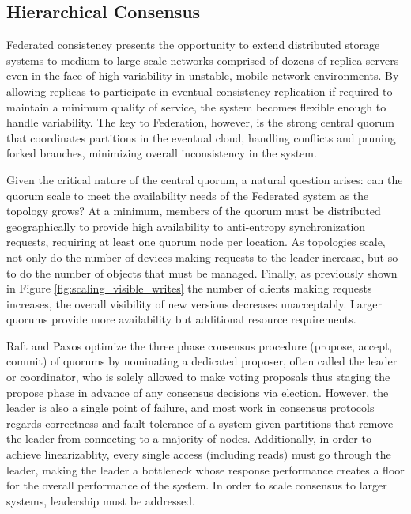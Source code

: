 \documentclass{article}
\begin{document}
\subsection{Hierarchical Consensus}

Federated consistency presents the opportunity to extend distributed storage systems to medium to large scale networks comprised of dozens of replica servers even in the face of high variability in unstable, mobile network environments. By allowing replicas to participate in eventual consistency replication if required to maintain a minimum quality of service, the system becomes flexible enough to handle variability. The key to Federation, however, is the strong central quorum that coordinates partitions in the eventual cloud, handling conflicts and pruning forked branches, minimizing overall inconsistency in the system.

Given the critical nature of the central quorum, a natural question arises: can the quorum scale to meet the availability needs of the Federated system as the topology grows? At a minimum, members of the quorum must be distributed geographically to provide high availability to anti-entropy synchronization requests, requiring at least one quorum node per location. As topologies scale, not only do the number of devices making requests to the leader increase, but so to do the number of objects that must be managed. Finally, as previously shown in Figure \ref{fig:scaling_visible_writes} the number of clients making requests increases, the overall visibility of new versions decreases unacceptably. Larger quorums provide more availability but additional resource requirements.

Raft and Paxos optimize the three phase consensus procedure (propose, accept, commit) of quorums by nominating a dedicated proposer, often called the leader or coordinator, who is solely allowed to make voting proposals thus staging the propose phase in advance of any consensus decisions via election. However, the leader is also a single point of failure, and most work in consensus protocols regards correctness and fault tolerance of a system given partitions that remove the leader from connecting to a majority of nodes. Additionally, in order to achieve linearizablity, every single access (including reads) must go through the leader, making the leader a bottleneck whose response performance creates a floor for the overall performance of the system. In order to scale consensus to larger systems, leadership must be addressed.
\end{document}
